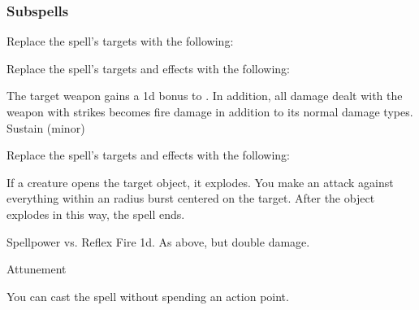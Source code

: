 \subsubsection{Subspells}
Replace the spell's targets with the following:
\begin{spellcontent}
\begin{augmenttargetinginfo}
\end{augmenttargetinginfo}
\end{spellcontent}
Replace the spell's targets and effects with the following:
\begin{spellcontent}
\begin{augmenttargetinginfo}
\end{augmenttargetinginfo}
\begin{augmenteffects}
\spelleffect
The target weapon gains a \plus1d bonus to .
In addition, all damage dealt with the weapon with strikes becomes fire damage in addition to its normal damage types.
\spelldur Sustain (minor)
\end{augmenteffects}
\end{spellcontent}
Replace the spell's targets and effects with the following:
\begin{spellcontent}
\begin{augmenttargetinginfo}
\end{augmenttargetinginfo}
\begin{augmenteffects}
\spelleffect
If a creature opens the target object, it explodes.
You make an attack against everything within an \areamed radius burst centered on the target.
After the object explodes in this way, the spell ends.
\begin{spellattack}{Spellpower vs. Reflex}
\spellsuccess Fire  \minus1d.
\spellcritical As above, but double damage.
\end{spellattack}
\spelldur Attunement
\end{augmenteffects}
\end{spellcontent}
You can cast the spell without spending an action point.
